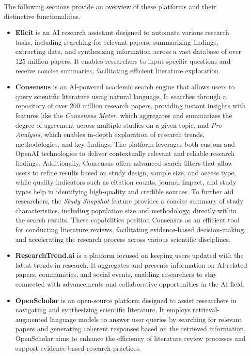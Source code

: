 The following sections 
provide an overview of these platforms and their distinctive functionalities.

\begin{itemize}
\item \textbf{Elicit} is an AI research assistant designed to automate various research tasks, including searching for relevant papers, summarizing findings, extracting data, and synthesizing information across a vast database of over 125 million papers. It enables researchers to input specific questions and receive concise summaries, facilitating efficient literature exploration.
\item \textbf{Consensus} is an AI-powered academic search engine that allows users to query scientific literature using natural language. It searches through a repository of over 200 million research papers, providing instant insights with features like the \textit{Consensus Meter}, which aggregates and summarizes the degree of agreement across multiple studies on a given topic, and \textit{Pro Analysis}, which enables in-depth exploration of research trends, methodologies, and key findings. The platform leverages both custom %
and OpenAI technologies to deliver contextually relevant and reliable research findings. Additionally, Consensus offers advanced search filters that allow users to refine results based on study design, sample size, and access type, while quality indicators such as citation counts, journal impact, and study types help in identifying high-quality and credible sources. To further aid researchers, the \textit{Study Snapshot} feature provides a concise summary of study characteristics, including population size and methodology, directly within the search results. These capabilities position Consensus as an efficient tool for conducting literature reviews, facilitating evidence-based decision-making, and accelerating the research process across various scientific disciplines.  
\item \textbf{ResearchTrend.ai} is a platform focused on keeping users updated with the latest trends in %
research. It aggregates and presents information on AI-related papers, communities, and social events, enabling researchers to stay connected with advancements and collaborative opportunities in the AI field.
\item \textbf{OpenScholar} is an open-source platform designed to assist researchers in navigating and synthesizing scientific literature. It employs retrieval-augmented language models to answer user queries by searching for relevant papers and generating coherent responses based on the retrieved information. OpenScholar aims to enhance the efficiency of literature review processes and support evidence-based research practices.

\end{itemize}
